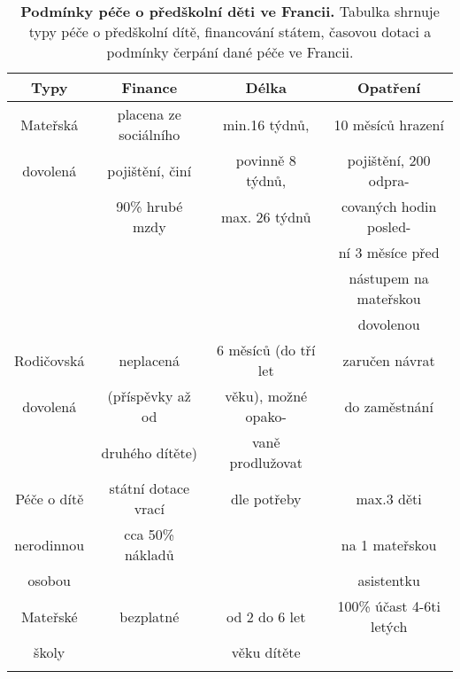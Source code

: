 		\begin{spacing}{1.0}
		\begin{table}[ht]
			\small
			\begin{center}
			\begin{tabular}{|c|c|c|c|}
				\hline
				\rowcolor{grey}		
				\textbf{Typy}	&	\textbf{Finance} & 	\textbf{Délka} 	&	\textbf{Opatření} 	\\
				\hline
				\hline
				\rowcolor{grey!10}
				Mateřská	&  placena ze sociálního &  min.16 týdnů, 	 & 10 měsíců hrazení 		\\ \rowcolor{grey!10}
				dovolená 	& 	 pojištění, činí  	 & 	povinně 8 týdnů, & pojištění, 200 odpra- 	\\ \rowcolor{grey!10}
				 			& 	90\% hrubé mzdy 	 &  max. 26 týdnů 	 & covaných hodin posled- 	\\ \rowcolor{grey!10}
				 			&						 & 					 & ní 3 měsíce před 		\\ \rowcolor{grey!10}
				 			&						 &					 & nástupem na mateřskou 	\\ \rowcolor{grey!10}
				 			&						 & 					 & dovolenou 				\\ \rowcolor{grey!10}
				\hline
				Rodičovská	& neplacená & 6 měsíců (do tří let 		& 	zaručen návrat 	\\ \rowcolor{grey!10}
				dovolená & (příspěvky až od & věku), možné opako-  	&  do zaměstnání	\\ \rowcolor{grey!10}
						 & druhého dítěte)  & vaně prodlužovat						&	\\ \rowcolor{grey!10}
				 \hline
				Péče o dítě	&	státní dotace vrací	&	dle potřeby	& max.3 děti \\ \rowcolor{grey!10}
				nerodinnou 	&	cca 50\% nákladů 	&	& na 1 mateřskou 	\\ \rowcolor{grey!10}
				osobou 		& 						&	& asistentku		\\ \rowcolor{grey!10}
				\hline
				Mateřské 	&	bezplatné	& od 2 do 6 let	& 100\% účast 4-6ti letých \\ \rowcolor{grey!10}
				školy 		& 	 			& věku dítěte	& 						\\ \rowcolor{grey!10}
				\hline
			\end{tabular}
			\end{center}
			\label{tab:peceFR}
			\caption{
				\textbf{Podmínky péče o předškolní děti ve Francii.}
				Tabulka shrnuje typy péče o předškolní dítě, financování státem, časovou dotaci a podmínky čerpání dané péče ve Francii.
							}
		\end{table}
		\end{spacing}

